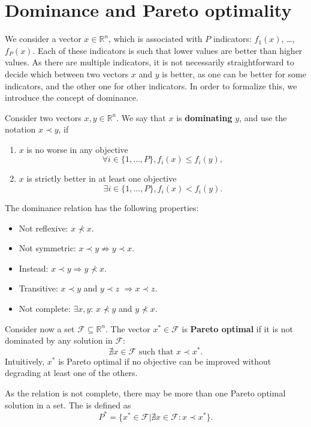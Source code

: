 \documentclass[12pt,a4paper]{article}
\newcommand{\R}{\mathbb{R}}
\begin{document}
\section{Dominance and Pareto optimality}\label{sec:pareto}

We consider a vector $x \in \R^n$, which is associated with $P$
indicators: $f_1(x)$, \ldots, $f_P(x)$. Each of these indicators is such
that lower values are better than higher values. As there are multiple
indicators, it is not necessarily straightforward to decide which
between two vectors $x$ and $y$ is better, as one can be better for
some indicators, and the other one for other indicators. In order to formalize this, we introduce the concept of dominance.

Consider two vectors $x, y \in \R^n$. We say that $x$ is \textbf{dominating} $y$, and use the  notation $x \prec y$, if
\begin{enumerate}
\item $x$ is no worse in any objective
  \[
  \forall i \in \{1, \ldots, P\}, f_i(x) \leq f_i(y),
  \]
\item $x$ is strictly better in at least one objective
  \[
  \exists i \in \{1, \ldots, P\}, f_i(x) < f_i(y).
  \]
\end{enumerate}
The dominance relation has the following properties:
\begin{itemize}
\item Not reflexive: $x \nprec x$.
\item Not symmetric: $x \prec y \not\Rightarrow y \prec x$.
\item Instead: $x \prec y \Rightarrow y \nprec x$.
\item Transitive: $x \prec y$ and $y \prec z$ $\Rightarrow x
  \prec z$.
  \item Not complete: $\exists x, y$: $x \nprec y$ and $y \nprec x$.
\end{itemize}

Consider now a set $\mathcal{F} \subseteq \R^n$. The vector $x^* \in
\mathcal{F}$ is \textbf{Pareto optimal} if it is not dominated by any
solution in $\mathcal{F}$:
\[
\nexists x \in \mathcal{F} \text{ such that } x \prec x^*.
\]
Intuitively, $x^*$ is Pareto optimal if no objective can be improved without
degrading at least one of the others.

As the relation is not complete, there may be more than one Pareto optimal solution in a
set. The  is defined as
\[
P^* = \{ x^* \in \mathcal{F} | \nexists x \in \mathcal{F}: x \prec x^* \}.
\]
\end{document}
